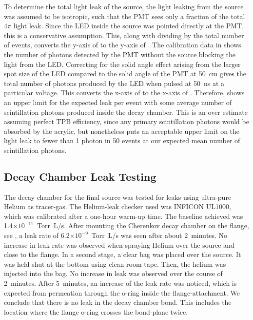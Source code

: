 To determine the total light leak of the source, the light leaking from the source was assumed to be isotropic, such that the PMT sees only a fraction of the total $4\pi$ light leak.
Since the LED inside the source was pointed directly at the PMT, this is a conservative assumption. 
This, along with dividing by the total number of events, converts the y-axis of  to the y-axis of . The calibration data in  shows the number of photons detected by the PMT without the source blocking the light from the LED. Correcting for the solid angle effect arising from the larger spot size of the LED compared to the solid angle of the PMT at 50~cm gives the total number of photons produced by the LED when pulsed at 50~ns at a particular voltage. This converts the x-axis of  to the x-axis of . Therefore,  shows an upper limit for the expected leak per event with some average number of scintillation photons produced inside the decay chamber. This is an over estimate assuming perfect TPB efficiency, since any primary scintillation photons would be absorbed by the acrylic, but nonetheless puts an acceptable upper limit on the light leak to fewer than 1 photon in 50 events at our expected mean number of scintillation photons.

\subsection{Decay Chamber Leak Testing}
\label{sec:heleak}
The decay chamber for the final source was tested for leaks using ultra-pure Helium as tracer-gas. The Helium-leak checker used was INFICON UL1000, which was calibrated after a one-hour warm-up time. The baseline achieved was 1.4$\times10^{-11}$~Torr~L/s. After mounting the Cherenkov decay chamber on the flange, see , a leak rate of 6.2$\times10^{-9}$~Torr~L/s was seen after about 2~minutes. No increase in leak rate was observed when spraying Helium over the source and close to the flange. In a second stage, a clear bag was placed over the source. It was held shut at the bottom using clean-room tape. Then, the helium was injected into the bag. No increase in leak was observed over the course of 2~minutes. After 5~minutes, an increase of the leak rate was noticed, which is expected from permeation through the o-ring inside the flange-attachment. We conclude that there is no leak in the decay chamber bond. This includes the location where the flange o-ring crosses the bond-plane twice.

